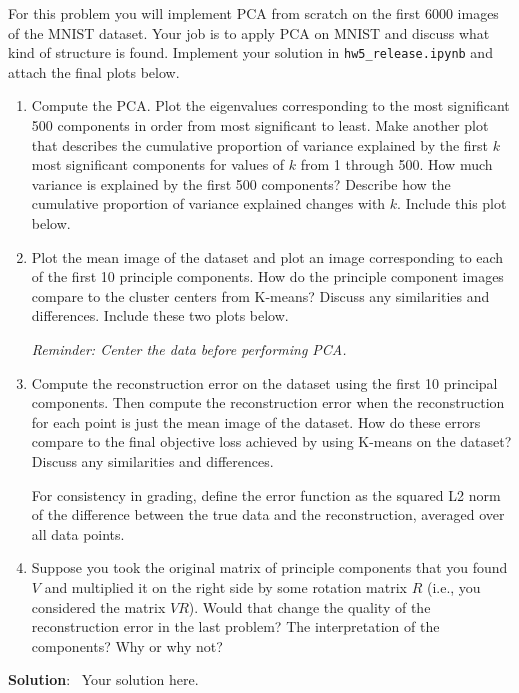 \documentclass[submit]{../harvardml}
\newenvironment{solution}{%
    \vspace{2mm}\color{blue}\noindent\textbf{Solution}:\ }
{}
\begin{document}
\begin{problem}[PCA]

  For this problem you will implement PCA from scratch on the first 6000 images of the MNIST dataset. Your job is to apply PCA on MNIST and discuss what kind of structure is found. Implement your solution in \texttt{hw5\_release.ipynb} and attach the final plots below. \\

  \begin{enumerate}

    \item Compute the PCA. Plot the eigenvalues corresponding to the most
    significant 500 components in order from most significant to
    least. Make another plot that describes the cumulative proportion of
    variance explained by the first $k$ most significant components for
    values of $k$ from 1 through 500.  How much variance is explained by
    the first 500 components?  Describe how the cumulative proportion of
    variance explained changes with $k$.  Include this plot below.

    \item Plot the mean image of the dataset and plot an image
    corresponding to each of the first 10 principle components.  How do
    the principle component images compare to the cluster centers from
    K-means? Discuss any similarities and differences.  Include these
    two plots below.
    
    \textit{Reminder: Center the data before performing PCA.}

    \item Compute the reconstruction error on the dataset using the first 10 principal components. Then compute the reconstruction error when the reconstruction for each point is just the mean
    image of the dataset. How do these errors compare to
    the final objective loss achieved by using K-means on the dataset?
    Discuss any similarities and differences.

    For consistency in grading, define the error function as the squared L2
    norm of the difference between the true data and the reconstruction, averaged over all data points.
  
    \item Suppose you took the original matrix of principle components
    that you found $V$ and multiplied it on the right side by some rotation matrix $R$ (i.e., you considered the matrix $VR$).
    Would that change the quality of the reconstruction error in the
    last problem?  The interpretation of the components?  Why or why
    not?

  \end{enumerate}
\end{problem}

\begin{solution}
	Your solution here.
\end{solution}
\end{document}
